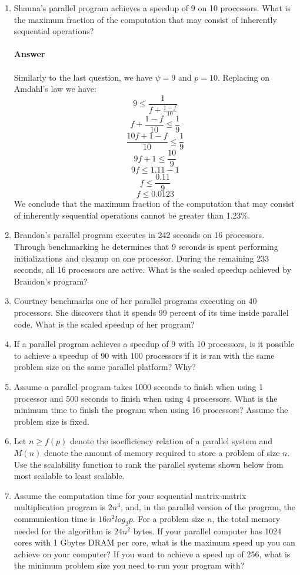 \documentclass[10pt]{scrartcl}
\begin{document}
\begin{enumerate}
 \item Shauna's parallel program achieves a speedup of 9 on 10 processors. What is the maximum fraction of the computation that may consist of inherently sequential operations?\\
 \\ 
 \textbf{Answer}\\
 \\
 Similarly to the last question, we have $\psi=9$ and $p=10$.  Replacing on Amdahl's law we have:
 $$ 9 \leq \frac{1}{f + \frac{1 - f}{10}} $$
 $$ f + \frac{1 - f}{10} \leq \frac{1}{9} $$
 $$ \frac{10f + 1 - f}{10} \leq \frac{1}{9} $$
 $$ 9f + 1 \leq \frac{10}{9} $$
 $$ 9f \leq 1.11 - 1 $$
 $$ f \leq \frac{0.11}{9} $$
 $$ f \leq 0.0123 $$
 We conclude that the maximum fraction of the computation that may consist of inherently sequential operations cannot be greater than 1.23\%.
 
 \item Brandon's parallel program executes in 242 seconds on 16 processors. Through benchmarking he determines that 9 seconds is spent performing initializations and cleanup on one processor. During the remaining 233 seconds, all 16 processors are active. What is the scaled speedup achieved by Brandon's program?
 \item Courtney benchmarks one of her parallel programs executing on 40 processors. She discovers that it spends 99 percent of its time inside parallel code. What is the scaled speedup of her program?
 \item If a parallel program achieves a speedup of 9 with 10 processors, is it possible to achieve a speedup of 90 with 100 processors if it is ran with the same problem size on the same parallel platform? Why?
 \item Assume a parallel program takes 1000 seconds to finish when using 1 processor and 500 seconds to finish when using 4 processors. What is the minimum time to finish the program when using 16 processors? Assume the problem size is fixed.
 \item Let $n \geqslant f(p)$ denote the isoefficiency relation of a parallel system and $M(n)$ denote the amount of memory required to store a problem of size $n$. Use the scalability function to rank the parallel systems shown below from most scalable to least scalable.
 \item Assume the computation time for your sequential matrix-matrix multiplication program is $2n^3$, and, in the parallel version of the program, the communication time is $16n^2log_2p$. For a problem size $n$, the total memory needed for the algorithm is $24n^2$ bytes. If your parallel computer has 1024 cores with 1 Gbytes DRAM per core, what is the maximum speed up you can achieve on your computer? If you want to achieve a speed up of 256, what is the minimum problem size you need to run your program with?
\end{enumerate}
\end{document}
